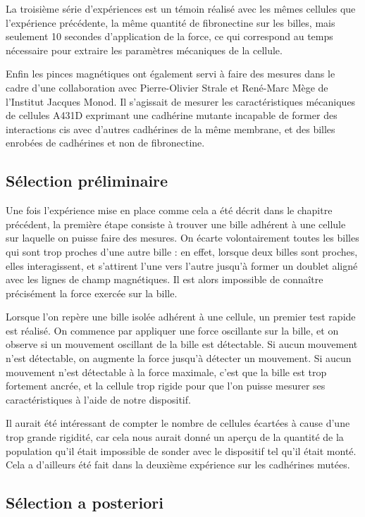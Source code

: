 \documentclass{report}
\begin{document}
La troisième série d'expériences est un témoin réalisé avec les mêmes cellules que l'expérience précédente, la même quantité de fibronectine sur les billes, mais seulement 10 secondes d'application de la force, ce qui correspond au temps nécessaire pour extraire les paramètres mécaniques de la cellule. 


Enfin les pinces magnétiques ont également servi à faire des mesures dans le cadre d'une collaboration avec Pierre-Olivier Strale et René-Marc Mège de l'Institut Jacques Monod. Il s'agissait de mesurer les caractéristiques mécaniques de cellules A431D exprimant une cadhérine mutante incapable de former des interactions cis avec d'autres cadhérines de la même membrane, et des billes enrobées de cadhérines et non de fibronectine. 


\subsection{Sélection préliminaire}

Une fois l'expérience mise en place comme cela a été décrit dans le chapitre précédent, la première étape consiste à trouver une bille adhérent à une cellule sur laquelle on puisse faire des mesures. 
On écarte volontairement toutes les billes qui sont trop proches d'une autre bille : en effet, lorsque deux billes sont proches, elles interagissent, et s'attirent l'une vers l'autre jusqu'à former un doublet aligné avec les lignes de champ magnétiques. Il est alors impossible de connaître précisément la force exercée sur la bille. 

Lorsque l'on repère une bille isolée adhérent à une cellule, un premier test rapide est réalisé.
On commence par appliquer une force oscillante sur la bille, et on observe si un mouvement oscillant de la bille est détectable. Si aucun mouvement n'est détectable, on augmente la force jusqu'à détecter un mouvement. Si aucun mouvement n'est détectable à la force maximale, c'est que la bille est trop fortement ancrée, et la cellule trop rigide pour que l'on puisse mesurer ses caractéristiques à l'aide de notre dispositif. 

Il aurait été intéressant de compter le nombre de cellules écartées à cause d'une trop grande rigidité, car cela nous aurait donné un aperçu de la quantité de la population qu'il était impossible de sonder avec le dispositif tel qu'il était monté. Cela a d'ailleurs été fait dans la deuxième expérience sur les cadhérines mutées. 

\subsection{Sélection a posteriori}
\end{document}
